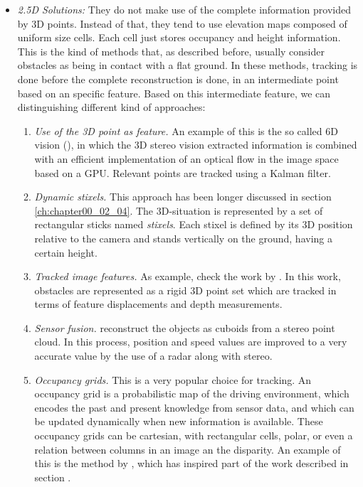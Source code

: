 \begin{itemize}
 \item \emph{2.5D Solutions:} They do not make use of the complete information provided by 3D points. Instead of that, they tend to use elevation maps composed of uniform size cells. Each cell just stores occupancy and height information. This is the kind of methods that, as described before, usually consider obstacles as being in contact with a flat ground.
 In these methods, tracking is done before the complete reconstruction is done, in an intermediate point based on an specific feature. Based on this intermediate feature, we can distinguishing different kind of approaches:
  \begin{enumerate}
   \item \emph{Use of the 3D point as feature.} An example of this is the so called 6D vision (\cite{franke20056d}), in which the 3D stereo vision extracted information is combined with an efficient implementation of an optical flow in the image space based on a \ac{GPU}. Relevant points are tracked using a Kalman filter.
   \item \emph{Dynamic stixels.} This approach has been longer discussed in section \ref{ch:chapter00_02_04}. The 3D-situation is represented by a set of rectangular sticks named \emph{stixels}. Each stixel is defined by its 3D position relative to the camera and stands vertically on the ground, having a certain height.
   \item \emph{Tracked image features.} As example, check the work by \cite{barth2009estimating}. In this work, obstacles are represented as a rigid 3D point set which are tracked in terms of feature displacements and depth measurements.
   \item \emph{Sensor fusion.} \cite{wu2009collision} reconstruct the objects as cuboids from a stereo point cloud. In this process, position and speed values are improved to a very accurate value by the use of a radar along with stereo.
   \item \emph{Occupancy grids.} This is a very popular choice for tracking. An occupancy grid is a probabilistic map of the driving environment, which encodes the past and present knowledge from sensor data, and which can be updated dynamically when new information is available. These occupancy grids can be cartesian, with rectangular cells, polar, or even a relation between columns in an image an the disparity. An example of this is the method by \cite{danescu2012particle}, which has inspired part of the work described in section \todo { \ref{XXX}}.

\end{enumerate}
\end{itemize}

